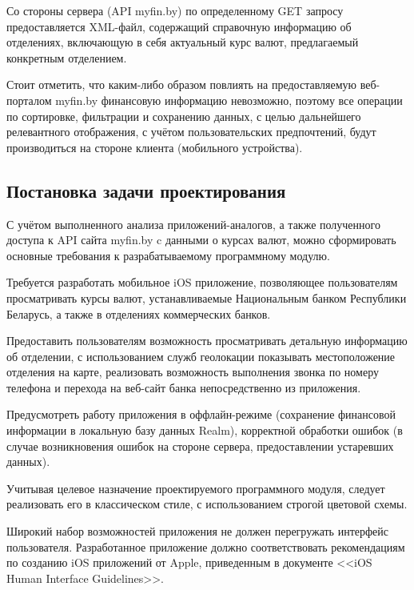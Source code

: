 Со стороны сервера (API myfin.by) по определенному GET запросу
предоставляется XML-файл, содержащий справочную информацию об отделениях,
включающую в себя актуальный курс валют, предлагаемый конкретным отделением.

Стоит отметить, что каким-либо образом повлиять на предоставляемую веб-порталом myfin.by
финансовую информацию невозможно, поэтому все операции по сортировке, фильтрации и
сохранению данных, с целью дальнейшего релевантного отображения, с учётом пользовательских
предпочтений, будут производиться на стороне клиента (мобильного устройства).



\subsection{Постановка задачи проектирования}
\label{subs:task_definition}

С учётом выполненного анализа приложений-аналогов, а также полученного доступа к
API сайта myfin.by c данными о курсах валют, можно сформировать основные
требования к разрабатываемому программному модулю.

Требуется разработать мобильное iOS приложение, позволяющее пользователям
просматривать курсы валют, устанавливаемые Национальным банком Республики Беларусь,
а также в отделениях коммерческих банков.

Предоставить пользователям возможность просматривать детальную информацию
об отделении, с использованием служб геолокации показывать
местоположение отделения на карте, реализовать возможность выполнения
звонка по номеру телефона и перехода на веб-сайт банка непосредственно
из приложения.

Предусмотреть работу приложения в оффлайн-режиме (сохранение финансовой
информации в локальную базу данных Realm), корректной обработки ошибок (в
случае возникновения ошибок на стороне сервера, предоставлении устаревших данных).

Учитывая целевое назначение проектируемого программного модуля, следует
реализовать его в классическом стиле, с использованием строгой цветовой схемы.

Широкий набор возможностей приложения не должен перегружать
интерфейс пользователя.
Разработанное приложение должно соответствовать рекомендациям по созданию
iOS приложений от Apple, приведенным в документе <<iOS Human Interface Guidelines>>.

